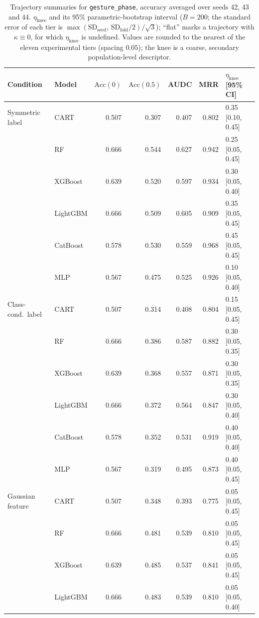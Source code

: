 \begin{table}[p]
\centering
\scriptsize
\setlength{\tabcolsep}{3.5pt}
\caption{Trajectory summaries for \texttt{gesture\_phase}, accuracy averaged over seeds 42, 43 and 44. $\eta_{\mathrm{knee}}$ and its 95\% parametric-bootstrap interval ($B=200$; the standard error of each tier is $\max(\mathrm{SD}_{\mathrm{seed}},\,\mathrm{SD}_{\mathrm{fold}}/2)/\sqrt3$); ``flat'' marks a trajectory with $\kappa\equiv 0$, for which $\eta_{\mathrm{knee}}$ is undefined. Values are rounded to the nearest of the eleven experimental tiers (spacing $0.05$); the knee is a coarse, secondary population-level descriptor.}
\label{tab:traj_gesture_phase}
\begin{tabular}{@{}llrrrrl@{}}
\toprule
Condition & Model & $\mathrm{Acc}(0)$ & $\mathrm{Acc}(0.5)$ & AUDC & MRR & $\eta_{\mathrm{knee}}$ [95\% CI] \\
\midrule
Symmetric label & CART & 0.507 & 0.307 & 0.407 & 0.802 & 0.35 [0.10, 0.45] \\
 & RF & 0.666 & 0.544 & 0.627 & 0.942 & 0.25 [0.05, 0.45] \\
 & XGBoost & 0.639 & 0.520 & 0.597 & 0.934 & 0.30 [0.05, 0.40] \\
 & LightGBM & 0.666 & 0.509 & 0.605 & 0.909 & 0.35 [0.05, 0.45] \\
 & CatBoost & 0.578 & 0.530 & 0.559 & 0.968 & 0.45 [0.05, 0.45] \\
 & MLP & 0.567 & 0.475 & 0.525 & 0.926 & 0.10 [0.05, 0.40] \\
\midrule
Class-cond.\ label & CART & 0.507 & 0.314 & 0.408 & 0.804 & 0.15 [0.05, 0.45] \\
 & RF & 0.666 & 0.386 & 0.587 & 0.882 & 0.30 [0.05, 0.35] \\
 & XGBoost & 0.639 & 0.368 & 0.557 & 0.871 & 0.30 [0.05, 0.35] \\
 & LightGBM & 0.666 & 0.372 & 0.564 & 0.847 & 0.30 [0.05, 0.40] \\
 & CatBoost & 0.578 & 0.352 & 0.531 & 0.919 & 0.40 [0.05, 0.40] \\
 & MLP & 0.567 & 0.319 & 0.495 & 0.873 & 0.40 [0.05, 0.45] \\
\midrule
Gaussian feature & CART & 0.507 & 0.348 & 0.393 & 0.775 & 0.05 [0.05, 0.45] \\
 & RF & 0.666 & 0.481 & 0.539 & 0.810 & 0.05 [0.05, 0.45] \\
 & XGBoost & 0.639 & 0.485 & 0.537 & 0.841 & 0.05 [0.05, 0.45] \\
 & LightGBM & 0.666 & 0.483 & 0.539 & 0.810 & 0.05 [0.05, 0.40] \\

\end{tabular}
\end{table}
